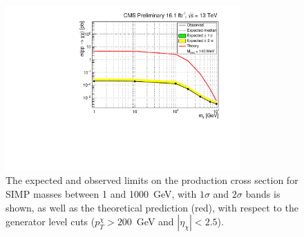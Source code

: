 \begin{figure}[ht]
  \centering
  \includegraphics[width=0.8\textwidth]{figures/SIMP_limit_ChF0p05_unblinded.pdf}\hfill%
  \caption{The expected and observed limits on the production cross section for \ac{SIMP} masses between 1 and 1000~GeV, with $1\sigma$ and $2\sigma$ bands is shown, as well as the theoretical prediction (red), with respect to the generator level cuts ($p_T^{\chi} > 200$~GeV and $|\eta_{\chi}| < 2.5$).}
  \label{fig:SIMP_limit_unblinded}
\end{figure}

\clearpage


\clearpage{\pagestyle{empty}\cleardoublepage}
